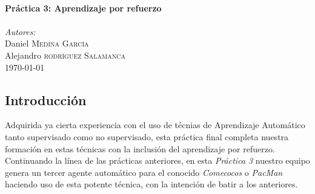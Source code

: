 \documentclass[12pt]{article}
\begin{document}
\begin{titlepage}
\HRule \\[0.7cm]
{ \huge \bfseries Práctica 3: Aprendizaje por refuerzo}\\[0.4cm] %
\HRule \\[0.7cm]


\textit{Autores:}\\
Daniel \textsc{Medina García}\\ %
Alejandro \textsc{rodríguez Salamanca}\\[1.1cm] %


{\large \today}\\ %


\vfill %

\end{titlepage}

\tableofcontents

\newpage
\thispagestyle{empty}
\clearpage
\vspace*{\fill}
\begin{center}
    \begin{minipage}{\textwidth}
        \begin{center}
            \section*{Introducción}

            Adquirida ya cierta experiencia con el uso de técnias de Aprendizaje Automático tanto supervisado como no supervisado, esta práctica final completa nuestra formación en estas técnicas con la inclusión del aprendizaje por refuerzo. Continuando la línea de las prácticas anteriores, en esta \textit{Práctica 3} nuestro equipo genera un tercer agente automático para el conocido \textit{Comecocos} o \textit{PacMan} haciendo uso de esta potente técnica, con la intención de batir a los anteriores.

        \end{center}
    \end{minipage}
\end{center}
\vfill
\end{document}
